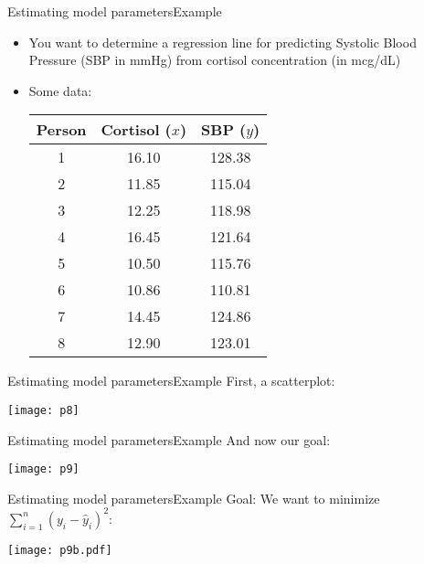 \documentclass[xcolor=dvipsnames]{beamer}
\begin{document}
\begin{frame}{Estimating model parameters}{Example}
	\begin{itemize}
		\item You want to determine a regression line for predicting Systolic Blood Pressure (SBP in mmHg) from cortisol concentration (in mcg/dL)
		\item Some data:
		\begin{center}
			\begin{tabular}{ccc}
				\hline
				Person& Cortisol ($x$) & SBP ($y$) \\ 
				\hline
				1 & 16.10 & 128.38 \\ 
				2 & 11.85 & 115.04 \\ 
				3 & 12.25 & 118.98 \\ 
				4 & 16.45 & 121.64 \\ 
				5 & 10.50 & 115.76 \\ 
				6 & 10.86 & 110.81 \\ 
				7 & 14.45 & 124.86 \\ 
				8 & 12.90 & 123.01 \\ 
				\hline
			\end{tabular}
		\end{center}
	\end{itemize}
\end{frame}

\begin{frame}{Estimating model parameters}{Example}
First, a scatterplot:
\begin{center}
	\texttt{[image: p8]}
\end{center}
\end{frame}

\begin{frame}{Estimating model parameters}{Example}
And now our goal:
\begin{center}
	\texttt{[image: p9]}
\end{center}
\end{frame}

\begin{frame}{Estimating model parameters}{Example}
Goal: We want to minimize $\sum_{i=1}^{n} \left(y_i - \hat{y}_i\right)^2$:
\begin{center}
	\texttt{[image: p9b.pdf]}
\end{center}
\end{frame}
\end{document}
